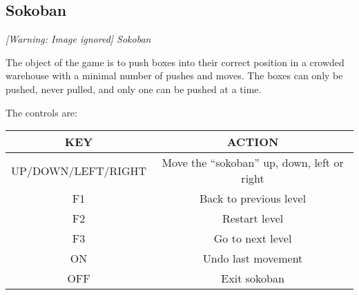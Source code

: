 \subsection{Sokoban}
{\centering\itshape
  [Warning: Image ignored] %
 \newline
Sokoban
\par}

The object of the game is to push boxes into their correct position in a
crowded warehouse with a minimal number of pushes and moves. The boxes
can only be pushed, never pulled, and only one can be pushed at a time.

The controls are:

\begin{table}[h!]
\begin{tabular}{|c|c|}
\hline
KEY & ACTION \\\hline
UP/DOWN/LEFT/RIGHT & Move the ``sokoban'' up, down, left or right \\\hline
F1 & Back to previous level \\\hline
F2 & Restart level \\\hline
F3 & Go to next level \\\hline
ON & Undo last movement \\\hline
OFF & Exit sokoban \\\hline
\end{tabular}
\end{table}


